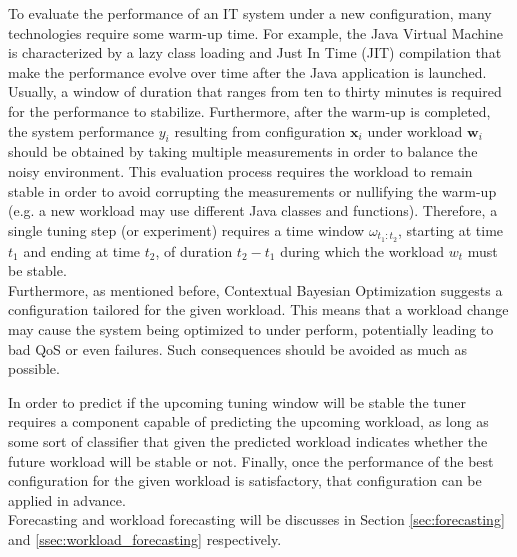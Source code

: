 \documentclass[a4paper, 12pt]{article} %
\begin{document}
	To evaluate the performance of an IT system under a new configuration, many technologies require some warm-up time. For example, the Java Virtual Machine is characterized by a lazy class loading and Just In Time (JIT) compilation that make the performance evolve over time after the Java application is launched. Usually, a window of duration that ranges from ten to thirty minutes is required for the performance to stabilize. Furthermore, after the warm-up is completed, the system performance $y_i$ resulting from configuration $\pmb{x}_i$ under workload $\pmb{w}_i$ should be obtained by taking multiple measurements in order to balance the noisy environment. This evaluation process requires the workload to remain stable in order to avoid corrupting the measurements or nullifying the warm-up (e.g. a new workload may use different Java classes and functions). Therefore, a single tuning step (or experiment) requires a time window $\omega_{t_1:t_2}$, starting at time $t_1$ and ending at time $t_2$, of duration $t_2 - t_1$ during which the workload $w_t$ must be stable.\\
	Furthermore, as mentioned before, Contextual Bayesian Optimization suggests a configuration tailored for the given workload.  This means that a workload change may cause the system being optimized to under perform, potentially leading to bad QoS or even failures. Such consequences should be avoided as much as possible.
	
	In order to predict if the upcoming tuning window will be stable the tuner requires a component capable of predicting the upcoming workload, as long as some sort of classifier that given the predicted workload indicates whether the future workload will be stable or not.
	Finally, once the performance of the best configuration for the given workload is satisfactory, that configuration can be applied in advance.\\
	Forecasting and workload forecasting will be discusses in Section \ref{sec:forecasting} and \ref{ssec:workload_forecasting} respectively.
	
\end{document}
